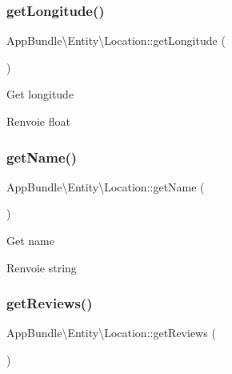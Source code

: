 \subsubsection{\texorpdfstring{get\+Longitude()}{getLongitude()}}
{\footnotesize\ttfamily App\+Bundle\textbackslash{}\+Entity\textbackslash{}\+Location\+::get\+Longitude (\begin{DoxyParamCaption}{ }\end{DoxyParamCaption})}

Get longitude

\begin{DoxyReturn}{Renvoie}
float 
\end{DoxyReturn}
\mbox{\label{classAppBundle_1_1Entity_1_1Location_af45b7253351a49a59704ff76bf65d945}} 
\subsubsection{\texorpdfstring{get\+Name()}{getName()}}
{\footnotesize\ttfamily App\+Bundle\textbackslash{}\+Entity\textbackslash{}\+Location\+::get\+Name (\begin{DoxyParamCaption}{ }\end{DoxyParamCaption})}

Get name

\begin{DoxyReturn}{Renvoie}
string 
\end{DoxyReturn}
\mbox{\label{classAppBundle_1_1Entity_1_1Location_a6a8cdadd950886f414ea7c456e8e4a5e}} 
\subsubsection{\texorpdfstring{get\+Reviews()}{getReviews()}}
{\footnotesize\ttfamily App\+Bundle\textbackslash{}\+Entity\textbackslash{}\+Location\+::get\+Reviews (\begin{DoxyParamCaption}{ }\end{DoxyParamCaption})}

